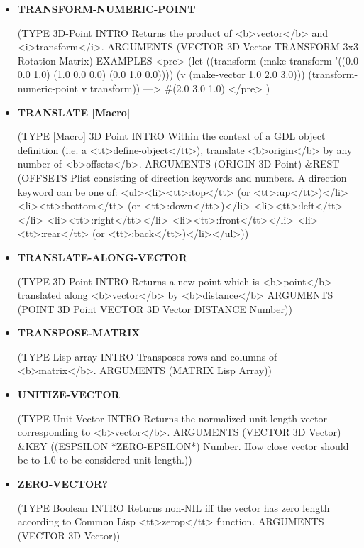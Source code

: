 \documentclass [11pt]{book}
\begin{document}
\begin{itemize}
\item {}
\label{prim:transform-numeric-point}
\textbf{TRANSFORM-NUMERIC-POINT}

(TYPE 3D-Point INTRO  Returns the product of <b>vector</b> and <i>transform</i>.
 ARGUMENTS (VECTOR 3D Vector TRANSFORM 3x3 Rotation Matrix) EXAMPLES 
<pre>
(let ((transform (make-transform '((0.0 0.0 1.0)
                                    (1.0 0.0 0.0)
                                    (0.0 1.0 0.0))))
       (v (make-vector 1.0 2.0 3.0)))
   (transform-numeric-point v transform))
  ---> \#(2.0 3.0 1.0)
</pre>
)



\item {}
\label{prim:translate}
\textbf{TRANSLATE [Macro]}

(TYPE [Macro] 3D Point INTRO  Within the context of a GDL object definition (i.e. a <tt>define-object</tt>),
translate <b>origin</b> by any number of <b>offsets</b>.
 ARGUMENTS (ORIGIN 3D Point) \&REST (OFFSETS Plist consisting of direction keywords and numbers. A direction keyword can be 
one of: <ul><li><tt>:top</tt> (or <tt>:up</tt>)</li>
<li><tt>:bottom</tt> (or <tt>:down</tt>)</li>
<li><tt>:left</tt></li>
<li><tt>:right</tt></li>
<li><tt>:front</tt></li>
<li><tt>:rear</tt> (or <tt>:back</tt>)</li></ul>))



\item {}
\label{prim:translate-along-vector}
\textbf{TRANSLATE-ALONG-VECTOR}

(TYPE 3D Point INTRO  Returns a new point which is <b>point</b> translated
along <b>vector</b> by <b>distance</b>
 ARGUMENTS (POINT 3D Point VECTOR 3D Vector DISTANCE Number))



\item {}
\label{prim:transpose-matrix}
\textbf{TRANSPOSE-MATRIX}

(TYPE Lisp array INTRO  Transposes rows and columns of <b>matrix</b>.
 ARGUMENTS (MATRIX Lisp Array))



\item {}
\label{prim:unitize-vector}
\textbf{UNITIZE-VECTOR}

(TYPE Unit Vector INTRO  Returns the normalized unit-length vector corresponding to <b>vector</b>.
 ARGUMENTS (VECTOR 3D Vector) \&KEY ((ESPSILON *ZERO-EPSILON*) Number. How close vector should be to 1.0 to be considered unit-length.))



\item {}
\label{prim:zero-vector?}
\textbf{ZERO-VECTOR?}

(TYPE Boolean INTRO  Returns non-NIL iff the vector has zero length according to Common Lisp <tt>zerop</tt> function.
 ARGUMENTS (VECTOR 3D Vector))



\end{itemize}
\end{document}
